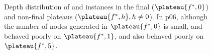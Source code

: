 \begin{figure}[htbp]
 \caption{Depth distribution of  and  instances in the final ($\plateau{f^*,0}$) and non-final plateaus ($\plateau{f^*,h}, h\not=0$). In  p06, although the number of nodes generated in $\plateau{f^*,0}$ is small, \fifo and \ro behaved poorly on $\plateau{f^*,1}$, and also \lifo behaved poorly on $\plateau{f^*,5}$.
 }
 \label{fig:depth-histogram4}
\end{figure}


